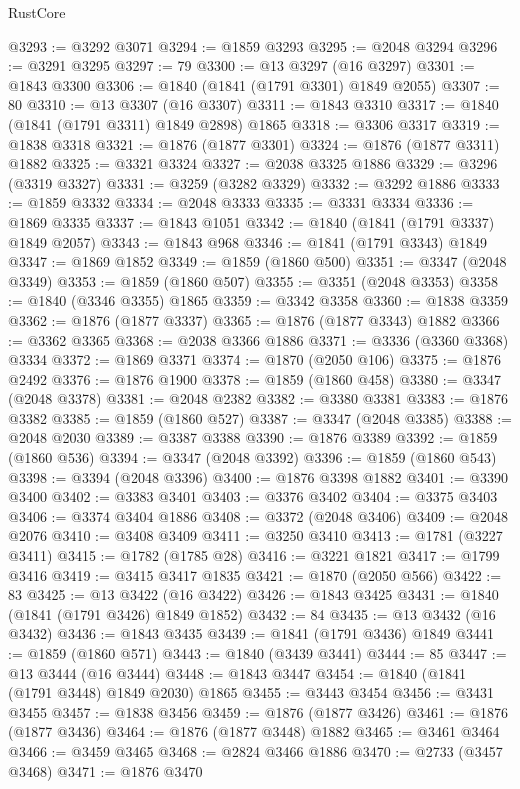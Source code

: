 \begin{lexlean}{RustCore}
\begin{coremodule}
@3293 := @3292 @3071
@3294 := @1859 @3293
@3295 := @2048 @3294
@3296 := @3291 @3295
@3297 := 79
@3300 := @13 @3297 (@16 @3297)
@3301 := @1843 @3300
@3306 := @1840 (@1841 (@1791 @3301) @1849 @2055)
@3307 := 80
@3310 := @13 @3307 (@16 @3307)
@3311 := @1843 @3310
@3317 := @1840 (@1841 (@1791 @3311) @1849 @2898) @1865
@3318 := @3306 @3317
@3319 := @1838 @3318
@3321 := @1876 (@1877 @3301)
@3324 := @1876 (@1877 @3311) @1882
@3325 := @3321 @3324
@3327 := @2038 @3325 @1886
@3329 := @3296 (@3319 @3327)
@3331 := @3259 (@3282 @3329)
@3332 := @3292 @1886
@3333 := @1859 @3332
@3334 := @2048 @3333
@3335 := @3331 @3334
@3336 := @1869 @3335
@3337 := @1843 @1051
@3342 := @1840 (@1841 (@1791 @3337) @1849 @2057)
@3343 := @1843 @968
@3346 := @1841 (@1791 @3343) @1849
@3347 := @1869 @1852
@3349 := @1859 (@1860 @500)
@3351 := @3347 (@2048 @3349)
@3353 := @1859 (@1860 @507)
@3355 := @3351 (@2048 @3353)
@3358 := @1840 (@3346 @3355) @1865
@3359 := @3342 @3358
@3360 := @1838 @3359
@3362 := @1876 (@1877 @3337)
@3365 := @1876 (@1877 @3343) @1882
@3366 := @3362 @3365
@3368 := @2038 @3366 @1886
@3371 := @3336 (@3360 @3368) @3334
@3372 := @1869 @3371
@3374 := @1870 (@2050 @106)
@3375 := @1876 @2492
@3376 := @1876 @1900
@3378 := @1859 (@1860 @458)
@3380 := @3347 (@2048 @3378)
@3381 := @2048 @2382
@3382 := @3380 @3381
@3383 := @1876 @3382
@3385 := @1859 (@1860 @527)
@3387 := @3347 (@2048 @3385)
@3388 := @2048 @2030
@3389 := @3387 @3388
@3390 := @1876 @3389
@3392 := @1859 (@1860 @536)
@3394 := @3347 (@2048 @3392)
@3396 := @1859 (@1860 @543)
@3398 := @3394 (@2048 @3396)
@3400 := @1876 @3398 @1882
@3401 := @3390 @3400
@3402 := @3383 @3401
@3403 := @3376 @3402
@3404 := @3375 @3403
@3406 := @3374 @3404 @1886
@3408 := @3372 (@2048 @3406)
@3409 := @2048 @2076
@3410 := @3408 @3409
@3411 := @3250 @3410
@3413 := @1781 (@3227 @3411)
@3415 := @1782 (@1785 @28)
@3416 := @3221 @1821
@3417 := @1799 @3416
@3419 := @3415 @3417 @1835
@3421 := @1870 (@2050 @566)
@3422 := 83
@3425 := @13 @3422 (@16 @3422)
@3426 := @1843 @3425
@3431 := @1840 (@1841 (@1791 @3426) @1849 @1852)
@3432 := 84
@3435 := @13 @3432 (@16 @3432)
@3436 := @1843 @3435
@3439 := @1841 (@1791 @3436) @1849
@3441 := @1859 (@1860 @571)
@3443 := @1840 (@3439 @3441)
@3444 := 85
@3447 := @13 @3444 (@16 @3444)
@3448 := @1843 @3447
@3454 := @1840 (@1841 (@1791 @3448) @1849 @2030) @1865
@3455 := @3443 @3454
@3456 := @3431 @3455
@3457 := @1838 @3456
@3459 := @1876 (@1877 @3426)
@3461 := @1876 (@1877 @3436)
@3464 := @1876 (@1877 @3448) @1882
@3465 := @3461 @3464
@3466 := @3459 @3465
@3468 := @2824 @3466 @1886
@3470 := @2733 (@3457 @3468)
@3471 := @1876 @3470

\end{coremodule}
\end{lexlean}
